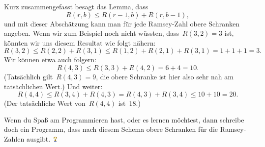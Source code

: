 \documentclass{../../zirkelblatt1718}
\theoremstyle{definition}
\theoremstyle{plain}
\theoremstyle{remark}
\newcommand{\happy}{\includegraphics[height=0.7em]{happy}\xspace}
\begin{document}
Kurz zusammengefasst besagt das Lemma, dass
\[ R(r,b) \leq R(r-1,b) + R(r,b-1), \]
und mit dieser Abschätzung kann man für jede Ramsey-Zahl obere Schranken
angeben. Wenn wir zum Beispiel noch nicht wüssten, dass~$R(3,2) = 3$ ist,
könnten wir uns diesem Resultat wie folgt nähern:
\[ R(3,2) \leq R(2,2) + R(3,1) \leq R(1,2) + R(2,1) + R(3,1) =
  1 + 1 + 1 = 3. \]
Wir können etwa auch folgern:
\[ R(4,3) \leq R(3,3) + R(4,2) = 6 + 4 = 10. \]
(Tatsächlich gilt~$R(4,3) = 9$, die obere Schranke ist hier also sehr nah am
tatsächlichen Wert.)
Und weiter:
\[ R(4,4) \leq R(3,4) + R(4,3) = R(4,3) + R(3,4) \leq 10 + 10 = 20. \]
(Der tatsächliche Wert von~$R(4,4)$ ist~$18$.)

Wenn du Spaß am Programmieren hast, oder es lernen möchtest, dann schreibe doch
ein Programm, dass nach diesem Schema obere Schranken für die Ramsey-Zahlen
ausgibt.~\happy
\end{document}
